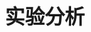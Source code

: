 %			
%			
%			
%			





\section{实验分析}
\label{sec:RANSAC-TRO-SQPnP:ExperimentCompare}
\vspace{1ex}
